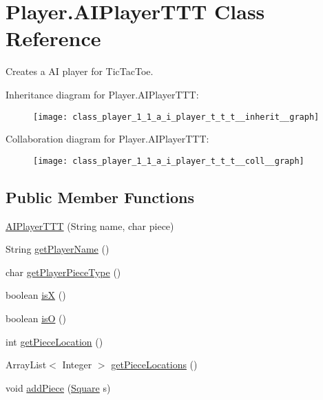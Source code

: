 \hypertarget{class_player_1_1_a_i_player_t_t_t}{}\section{Player.\+A\+I\+Player\+T\+T\+T Class Reference}
\label{class_player_1_1_a_i_player_t_t_t}


Creates a A\+I player for Tic\+Tac\+Toe.  




Inheritance diagram for Player.\+A\+I\+Player\+T\+T\+T\+:\nopagebreak
\begin{figure}[H]
\begin{center}
\leavevmode
\texttt{[image: class\_player\_1\_1\_a\_i\_player\_t\_t\_t\_\_inherit\_\_graph]}
\end{center}
\end{figure}


Collaboration diagram for Player.\+A\+I\+Player\+T\+T\+T\+:\nopagebreak
\begin{figure}[H]
\begin{center}
\leavevmode
\texttt{[image: class\_player\_1\_1\_a\_i\_player\_t\_t\_t\_\_coll\_\_graph]}
\end{center}
\end{figure}
\subsection*{Public Member Functions}
\begin{DoxyCompactItemize}
\item 
\hyperlink{class_player_1_1_a_i_player_t_t_t_ae14ec8ce7a73f91b999f61b3682d4d2a}{A\+I\+Player\+T\+T\+T} (String name, char piece)
\item 
String \hyperlink{class_player_1_1_a_i_player_t_t_t_aacc073468526cff79faa6ed3ab1ab58f}{get\+Player\+Name} ()
\item 
char \hyperlink{class_player_1_1_a_i_player_t_t_t_a9e15cc9460330e6c70e8b8f8b1ad420c}{get\+Player\+Piece\+Type} ()
\item 
boolean \hyperlink{class_player_1_1_a_i_player_t_t_t_af22521a88989d915f9942c05136c0138}{is\+X} ()
\item 
boolean \hyperlink{class_player_1_1_a_i_player_t_t_t_a46635ecc04b552870b7932c075abb83c}{is\+O} ()
\item 
int \hyperlink{class_player_1_1_a_i_player_t_t_t_a720325103f04baf7e91f74f38aae2dee}{get\+Piece\+Location} ()
\item 
Array\+List$<$ Integer $>$ \hyperlink{class_player_1_1_a_i_player_t_t_t_a134185b132dcb9caec6293b9e4c6f66f}{get\+Piece\+Locations} ()
\item 
void \hyperlink{class_player_1_1_a_i_player_t_t_t_a1892cf5a0820045fb9658892af0b1ea7}{add\+Piece} (\hyperlink{class_square_1_1_square}{Square} s)
\end{DoxyCompactItemize}

